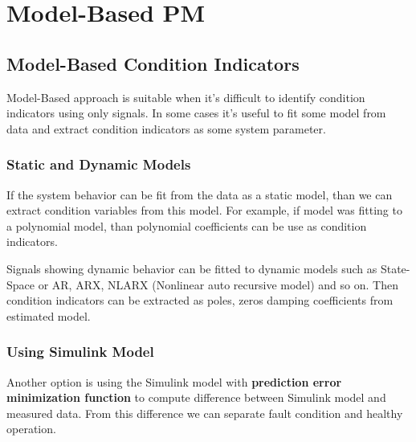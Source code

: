 \documentclass[class=article, crop=false]{standalone}
\begin{document}
\section{Model-Based PM}

\subsection{Model-Based Condition Indicators}
Model-Based approach is suitable when it's difficult to identify condition
indicators using only signals. In some cases it's useful to fit some model
from data and extract condition indicators as some system parameter.

\subsubsection{Static and Dynamic Models}
If the system behavior can be fit from the data as a static model, than we
can extract condition variables from this model. For example, if model
was fitting to a polynomial model, than polynomial coefficients can be use
as condition indicators.

Signals showing dynamic behavior can be fitted to dynamic models such as
State-Space or AR, ARX, NLARX (Nonlinear auto recursive model) and so on.
Then condition indicators can be extracted as poles, zeros damping
coefficients from estimated model.


\subsubsection{Using Simulink Model}
Another option is using the Simulink model with \textbf{prediction
error minimization function} to compute difference between Simulink model
and measured data. From this difference we can separate fault condition and
healthy operation. 
\end{document}
